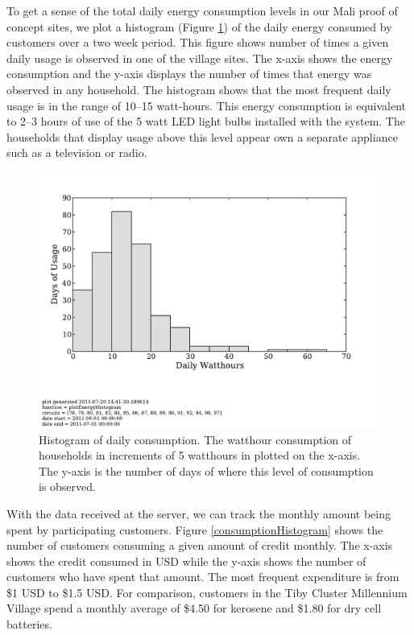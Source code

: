 \documentclass{sig-alternate}
\newcommand{\note}[1]{{\color{red} NOTE: *** #1 ***}}
\begin{document}
To get a sense of the total daily energy consumption levels in our Mali 
proof of concept sites, we plot a histogram (Figure \ref{energyHistogram}) 
of the daily energy consumed by customers over a two week period.
This figure shows number of times a given daily usage is observed in one of 
the village sites.
The x-axis shows the energy consumption and the y-axis displays the number
of times that energy was observed in any household.
The histogram shows that the most frequent daily usage is in the range of 
10--15 watt-hours.
This energy consumption is equivalent to 2--3 hours of use of the 5 watt LED
light bulbs installed with the system.
The households that display usage above this level appear own a separate 
appliance such as a television or radio. 

\begin{figure}[]
\begin{center}
\includegraphics[trim = 0in 1.3in 0in 0in, clip, width=\columnwidth]
                {figures/energyHistogram.pdf}
\end{center}
\caption{Histogram of daily consumption.  The watthour consumption of households
in increments of 5 watthours in plotted on the x-axis.  The y-axis is the number of
days of where this level of consumption is observed.}
\label{energyHistogram}
\end{figure}

With the data received at the server, we can track the monthly amount being 
spent by participating customers.
Figure \ref{consumptionHistogram} shows the number of customers consuming
a given amount of credit monthly.
The x-axis shows the credit consumed in USD while the y-axis shows the 
number of customers who have spent that amount.
The most frequent expenditure is from \$1 USD to \$1.5 USD.
For comparison, customers in the Tiby Cluster Millennium Village spend a
monthly average of \$4.50 for kerosene and \$1.80 for dry cell batteries.
\end{document}
